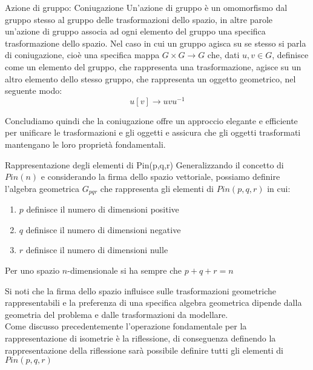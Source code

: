 \begin{frame}{Azione di gruppo: Coniugazione}
    Un’azione di gruppo è un omomorfismo dal gruppo stesso al gruppo delle trasformazioni dello spazio,
    in altre parole un’azione di gruppo associa ad ogni elemento del gruppo una specifica trasformazione dello spazio. 
    Nel caso in cui un gruppo agisca su se stesso si parla di coniugazione, cioè una specifica mappa \(G \times G\to G\) che,
    dati \(u, v \in G\), definisce come un elemento del gruppo, che rappresenta una trasformazione,
    agisce su un altro elemento dello stesso gruppo, che rappresenta un oggetto geometrico, 
    nel seguente modo:
   \begin{equation}
      u[v]\to uvu^{-1}
   \end{equation}
\end{frame}

\begin{frame}
    Concludiamo quindi che la coniugazione offre un approccio elegante e efficiente per unificare le trasformazioni e gli oggetti e assicura che gli oggetti trasformati mantengano le loro proprietà fondamentali. 
\end{frame}

\begin{frame}{Rappresentazione degli elementi di Pin(p,q,r)}
   Generalizzando il concetto di \(Pin(n)\) e considerando la firma dello spazio vettoriale, possiamo definire l’algebra geometrica \(G_{pqr}\)  che rappresenta gli elementi di  \(Pin(p,q,r)\) in cui:
   \begin{enumerate}
      \item \(p\) definisce il numero di dimensioni positive
      \item \(q\) definisce il numero di dimensioni negative
      \item \(r\) definisce il numero di dimensioni nulle
   \end{enumerate}
   Per uno spazio \(n\)-dimensionale si ha sempre che \(p+q+r = n\)
\end{frame}

\begin{frame}
    Si noti che la firma dello spazio influisce sulle trasformazioni geometriche rappresentabili e la preferenza di una specifica algebra geometrica dipende dalla geometria del problema e dalle trasformazioni da modellare.\\
   Come discusso precedentemente l’operazione fondamentale per la rappresentazione di isometrie è la riflessione, di conseguenza definendo la rappresentazione della riflessione sarà possibile definire tutti gli elementi di \(Pin(p,q,r)\)
\end{frame}

